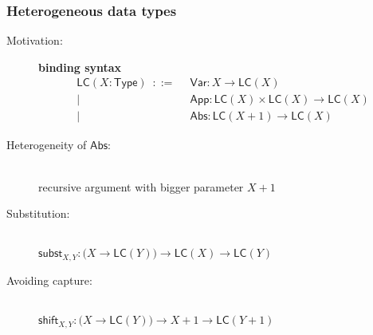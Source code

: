 \documentclass[
]
{beamer}
\newcommand{\constfont}[1]{\ensuremath{\mathsf{#1}}}
\newcommand{\shift}{\constfont{shift}}
\newcommand{\subst}{\constfont{subst}}
\newcommand{\App}{\constfont{App}}
\newcommand{\Abs}{\constfont{Abs}}
\newcommand{\Var}{\constfont{Var}}
\newcommand{\LC}{\mathsf{LC}}
\newcommand{\Set}{\constfont{Type}}
\newcommand{\fat}[1]{\textbf{#1}}
\begin{document}
\begin{frame}
  \frametitle{Heterogeneous data types}

 
  \begin{description}
    \item [Motivation:] \fat{binding syntax} 
           \begin{align*} \LC(X : \Set) \enspace ::=                                              
                                           \enspace  & \Var : X \to \LC(X) \\
                                           | \enspace  & \App : \LC(X)\times\LC(X)\to\LC(X) \\ 
                                           | \enspace &\Abs : \LC(X + 1) \to \LC(X) \enspace
           \end{align*}
    \item [Heterogeneity of $\Abs$:] \hfill \\ recursive argument with bigger parameter $X+1$
    
    \item [Substitution:] \hfill\\        
       $ \subst_{X,Y} : \bigl(X \to \LC (Y)\bigr) \to \LC (X) \to \LC (Y) $
    
    \item [Avoiding capture:] \hfill \\ $\shift_{X,Y} : \bigl(X \to \LC(Y)\bigr) \to X+1 \to \LC(Y+1)$
    
  \end{description}
\end{frame}
\end{document}
